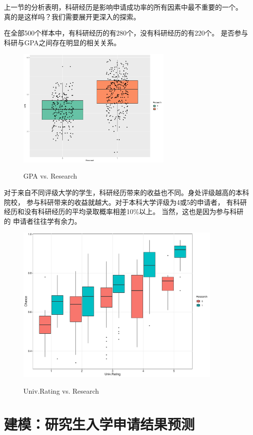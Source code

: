 \documentclass[12pt, UTF8, a4paper]{ctexart}
\begin{document}
上一节的分析表明，科研经历是影响申请成功率的所有因素中最不重要的一个。
真的是这样吗？我们需要展开更深入的探索。

在全部500个样本中，有科研经历的有280个，没有科研经历的有220个。
是否参与科研与GPA之间存在明显的相关关系。

\begin{figure}[htb]
    \centering
    \includegraphics[width=3in, keepaspectratio]{./pic/GPAresearch.pdf}\\
    \caption{GPA vs. Research}
\end{figure}

对于来自不同评级大学的学生，科研经历带来的收益也不同。身处评级越高的本科院校，
参与科研带来的收益就越大。对于本科大学评级为4或5的申请者，
有科研经历和没有科研经历的平均录取概率相差10\%以上。
当然，这也是因为参与科研的
申请者往往学有余力。

\begin{figure}[htb]
    \centering
    \includegraphics[width=4in, keepaspectratio]{./pic/univresearch.pdf}\\
    \caption{Univ.Rating vs. Research}
\end{figure}

\section{建模：研究生入学申请结果预测}
\end{document}
